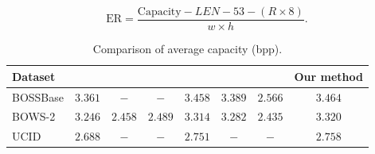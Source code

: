 \documentclass[journal]{IEEEtran}
\begin{document}
	\begin{equation}
		\mathrm{ER} = \frac{\mathrm{Capacity} - LEN - 53 - (R \times 8)}{w \times h}.
		\label{eq:bpp}
	\end{equation}
	
	
	
	
	
	
	
	\setlength{\tabcolsep}{4pt}
	\begin{table}[!t]
		\centering
		\caption{Comparison of average capacity (bpp).}
		\label{tab:compare}
		\begin{tabular}{lccccccc}
			\toprule
			Dataset  & \cite{Yin2020} & \cite{Puteaux2021} & \cite{Zhang2022} & \cite{Gao2023} & \cite{Sui2023} & \cite{Pang2023} & Our method \\
			\midrule
			BOSSBase & \(3.361\) & \(-\)     & \(-\)     & \(3.458\) & \(3.389\) & \(2.566\) & \(3.464\)  \\
			BOWS-2 	 & \(3.246\) & \(2.458\) & \(2.489\) & \(3.314\) & \(3.282\) & \(2.435\) & \(3.320\)  \\
			UCID 	 & \(2.688\) & \(-\)     & \(-\)     & \(2.751\) & \(-\)     & \(-\)     & \(2.758\)  \\
			\bottomrule
		\end{tabular}
	\end{table}
	
\end{document}
